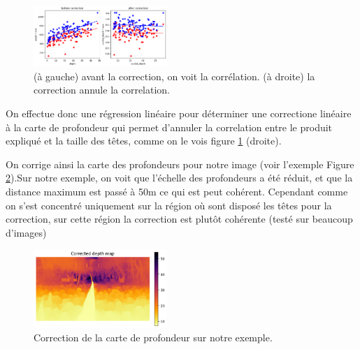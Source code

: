 \begin{figure}[h!]
    \centering
    \includegraphics[width=0.45\textwidth]{images/depth_correction.png}
    \caption{(à gauche) avant la correction, on voit la corrélation. (à droite) la correction annule la correlation. }
    \label{fig:depth-correction}
\end{figure}

On effectue donc une régression linéaire pour déterminer une correctione linéaire à la carte de profondeur qui permet d'annuler la correlation entre le produit expliqué et la taille des têtes, comme on le vois figure \ref{fig:depth-correction} (droite).

On corrige ainsi la carte des profondeurs pour notre image (voir l'exemple Figure \ref{fig:depth-correction-example}).Sur notre exemple, on voit que l'échelle des profondeurs a été réduit, et que la distance maximum est passé à 50m ce qui est peut cohérent. Cependant comme on s'est concentré uniquement sur la région où sont disposé les têtes pour la correction, sur cette région la correction est plutôt cohérente (testé sur beaucoup d'images)

\begin{figure}
    \centering
    \includegraphics[width=0.45\textwidth]{images/result_depth_map_correction.png}
    \caption{Correction de la carte de profondeur sur notre exemple.}
    \label{fig:depth-correction-example}
\end{figure}

